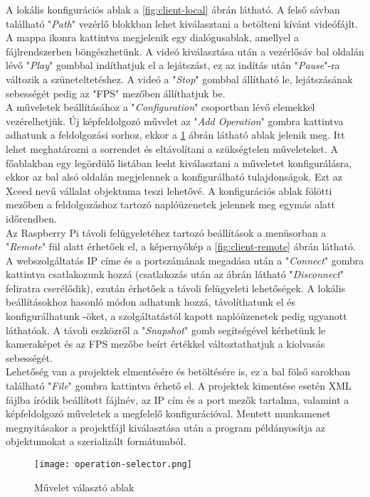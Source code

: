 A lokális konfigurációs ablak a \ref{fig:client-local} ábrán látható. A felső sávban található "\emph{Path}" vezérlő blokkban lehet kiválasztani a betölteni kívánt videófájlt. A mappa ikonra kattintva megjelenik egy dialógusablak, amellyel a fájlrendszerben böngészhetünk. A videó kiválasztása után a vezérlősáv bal oldalán lévő "\emph{Play}" gombbal indíthatjuk el a lejátszást, ez az indítás után "\emph{Pause}"-ra változik a szüneteltetéshez. A videó a "\emph{Stop}" gombbal állítható le, lejátszásának sebességét pedig az "FPS" mezőben állíthatjuk be.\\
A műveletek beállításához a "\emph{Configuration}" csoportban lévő elemekkel vezérelhetjük. Új képfeldolgozó művelet az "\emph{Add Operation}" gombra kattintva adhatunk a feldolgozási sorhoz, ekkor a \ref{fig:operation-selector} ábrán látható ablak jelenik meg. Itt lehet meghatározni a sorrendet és eltávolítani a szükségtelen műveleteket. A főablakban egy legördülő listában leeht kiválasztani a műveletet konfigurálásra, ekkor az bal alsó oldalán megjelennek a konfigurálható tulajdonságok. Ezt az Xceed nevű vállalat  objektuma teszi lehetővé. A konfigurációs ablak fölötti mezőben a feldolgozáshoz tartozó naplóüzenetek jelennek meg egymás alatt időrendben.\\
Az Raspberry Pi távoli felügyeletéhez tartozó beállítások a menüsorban a "\emph{Remote}" fül alatt érhetőek el, a képernyőkép a \ref{fig:client-remote} ábrán látható. A webszolgáltatás IP címe és a portszámának megadása után a "\emph{Connect}" gombra kattintva csatlakozunk hozzá (csatlakozás után az ábrán látható "\emph{Disconnect}" feliratra cserélődik), ezután érhetőek a távoli felügyeleti lehetőségek. A lokális beállításokhoz hasonló módon adhatunk hozzá, távolíthatunk el és konfigurálhatunk -öket, a szolgáltatástól kapott naplóüzenetek pedig ugyanott láthatóak. A távoli eszközről a "\emph{Snapshot}" gomb segítségével kérhetünk le kameraképet és az FPS mezőbe beírt értékkel változtathatjuk a kiolvasás sebességét.\\
Lehetőség van a projektek elmentésére és betöltésére is, ez a bal fölső sarokban található "\emph{File}" gombra kattintva érhető el. A projektek kimentése esetén XML fájlba íródik beállított fájlnév, az IP cím és a port mezők tartalma, valamint a képfeldolgozó műveletek a megfelelő konfigurációval. Mentett munkamenet megnyitásakor a projektfájl kiválasztása után a program példányosítja az objektumokat a szerializált formátumból.
 
\begin{figure}[h]
\vspace{.5cm}
\texttt{[image: operation-selector.png]}
\centering
\vspace{.2cm}
\caption{Művelet választó ablak}
\vspace{.5cm}
\label{fig:operation-selector}
\end{figure}

